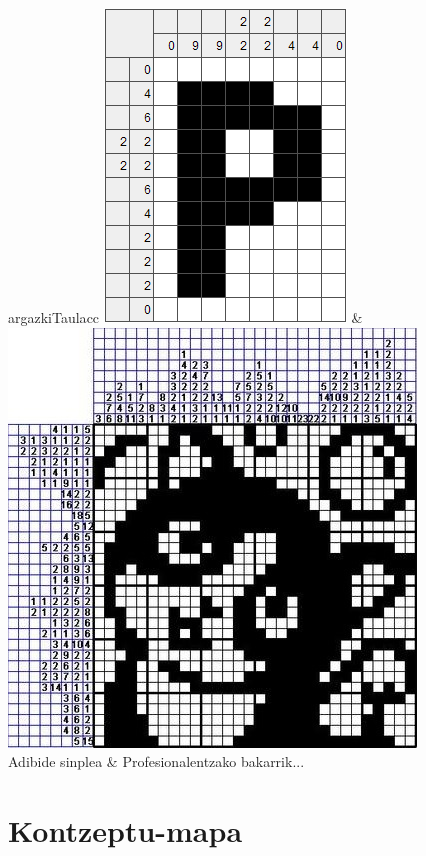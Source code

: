 \documentclass[dvipsnames]{../../../../AritzhClass}
\begin{document}
\begin{taula}{}{argazkiTaula}{cc}
\includegraphics[scale=0.75]{nonograma1} & \includegraphics[scale=0.75]{nonograma2} \\
Adibide sinplea & Profesionalentzako bakarrik...
\end{taula}

\section{Kontzeptu-mapa}
\end{document}
